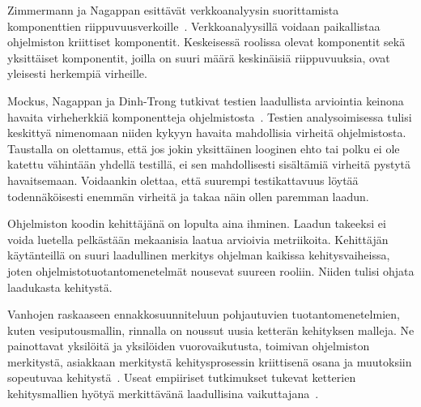 \documentclass[finnish]{../tktltiki2}
\theoremstyle{definition}
\theoremstyle{remark}
\begin{document}
    Zimmermann ja Nagappan esittävät verkkoanalyysin suorittamista komponenttien riippuvuusverkoille~\cite{ZN08}. 
Verkkoanalyysillä voidaan paikallistaa ohjelmiston kriittiset komponentit. Keskeisessä roolissa olevat komponentit sekä 
yksittäiset komponentit, joilla on suuri määrä keskinäisiä riippuvuuksia, ovat yleisesti herkempiä virheille.

    Mockus, Nagappan ja Dinh-Trong tutkivat testien laadullista arviointia keinona havaita virheherkkiä komponentteja 
ohjelmistosta~\cite{MNDT09}. Testien analysoimisessa tulisi keskittyä nimenomaan niiden kykyyn havaita mahdollisia 
virheitä ohjelmistosta. Taustalla on olettamus, että jos jokin yksittäinen looginen ehto tai polku ei ole katettu 
vähintään yhdellä testillä, ei sen mahdollisesti sisältämiä virheitä pystytä havaitsemaan. Voidaankin olettaa, että 
suurempi testikattavuus löytää todennäköisesti enemmän virheitä ja takaa näin ollen paremman laadun.

    Ohjelmiston koodin kehittäjänä on lopulta aina ihminen. Laadun takeeksi ei voida luetella pelkästään mekaanisia 
laatua arvioivia metriikoita. Kehittäjän käytänteillä on suuri laadullinen merkitys ohjelman kaikissa kehitysvaiheissa, 
joten ohjelmistotuotantomenetelmät nousevat suureen rooliin. Niiden tulisi ohjata laadukasta kehitystä.

    Vanhojen raskaaseen ennakkosuunniteluun pohjautuvien tuotantomenetelmien, kuten vesiputousmallin, rinnalla on 
noussut uusia ketterän kehityksen malleja. Ne painottavat yksilöitä ja yksilöiden vuorovaikutusta, toimivan ohjelmiston 
merkitystä, asiakkaan merkitystä kehitysprosessin kriittisenä osana ja muutoksiin sopeutuvaa kehitystä~\cite{BBB01}. 
Useat empiiriset tutkimukset tukevat ketterien kehitysmallien hyötyä merkittävänä laadullisina vaikuttajana~\cite{SS10}. 

\newpage




\end{document}

